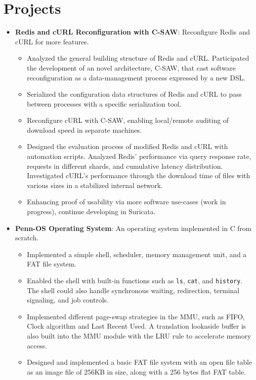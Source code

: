 \documentclass[a4paper]{article}
\newcommand{\resumeItem}[2]{
  \item\small{
    \textbf{#1}{: #2 \vspace{-2pt}}
  }
}
\newcommand{\resumeSubItem}[2]{\resumeItem{#1}{#2}\vspace{-3pt}}
\newcommand{\resumeSubHeadingListStart}{\begin{itemize}[leftmargin=*]}
\newcommand{\resumeSubHeadingListEnd}{\end{itemize}}
\begin{document}
\vspace{-5pt}
\section{Projects}
\resumeSubHeadingListStart
\resumeSubItem{Redis and cURL Reconfiguration with C-SAW}{Reconfigure Redis and
  cURL for more features.}
\begin{itemize}
  \item Analyzed the general building structure of Redis and cURL. Participated
        the development of an novel architecture, C-SAW, that cast software
        reconfiguration as a data-management process expressed by a new DSL.
  \item Serialized the configuration data structures of Redis and cURL to pass
        between processes with a specific serialization tool.
  \item Reconfigure cURL with C-SAW, enabling local/remote auditing of download
        speed in separate machines.
  \item Designed the evaluation process of modified Redis and cURL with
        automation scripts. Analyzed Redis' performance via query response rate,
        requests in different shards, and cumulative latency distribution.
        Investigated cURL's performance through the download time of files with
        various sizes in a stabilized internal network.
  \item Enhancing proof of usability via more software use-cases (work in
        progress), continue developing in Suricata.
\end{itemize}

\vspace{2pt}
\resumeSubItem{Penn-OS Operating System}
{An operating system implemented in C from scratch.}
\begin{itemize}
  \item Implemented a simple shell, scheduler, memory management unit, and a FAT
        file system.
  \item Enabled the shell with built-in functions such as \texttt{ls},
        \texttt{cat}, and \texttt{history}. The shell could also handle
        synchronous waiting, redirection, terminal signaling, and job controls.
  \item Implemented different page-swap strategies in the MMU, such as FIFO,
        Clock algorithm and Last Recent Used. A translation lookaside buffer is
        also built into the MMU module with the LRU rule to accelerate memory
        access.
  \item Designed and implemented a basic FAT file system with an open file table
        as an image file of 256KB in size, along with a 256 bytes flat FAT
        table.
\end{itemize}
\resumeSubHeadingListEnd
\end{document}
